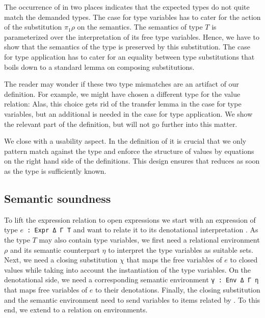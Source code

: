 \documentclass[sigplan,anonymous,review,screen]{acmart}
\begin{document}
The occurrence of {\Asubst} in two places indicates that the expected types do not quite
match the demanded types.
The case for type variables has to cater for the action of the
substitution $\pi_1\rho$ on the semantics. The semantics of type $T$
is parameterized over the interpretation of its free type
variables. Hence, we have to show that the semantics of the type is
preserved by this substitution.
\TFsubstVarPreservesType
The case for type application has to cater for an equality between
type substitutions that boils down to a standard lemma on composing
substitutions.
\LogicallemmaOne

The reader may wonder if these two type mismatches are an
artifact of our definition. For example, we might have chosen a
different type for the value relation:
\LogicalVariationMCVType
Alas, this choice gets rid of the transfer lemma in the case for type
variables, but an additional {\Asubst} is needed in the case for type
application. We show the relevant part of the definition, but will not go further into this matter.
\LogicalVariationMCVBodyUniversal

We close with a usability aspect.
In the definition of {\AVSem} it is crucial that we only pattern match
against the type and enforce the structure of values by equations on
the right hand side of the definitions. This design ensures that {\AVSem}
reduces as soon as the type is sufficiently known.

\subsection{Semantic soundness}
\label{sec:relat-open-expr}

To lift the expression relation {\AESem} to open expressions we start
with an expression of type \texttt{$e$ : Expr Δ Γ T} and want to relate it
to its denotational interpretation . As the type $T$
may also contain type variables, we first need a relational
environment $\rho$ and its semantic counterpart $\eta$ to interpret
the type variables as suitable sets.
Next, we need a closing substitution $\chi$ that maps the free
variables of $e$ to closed values while taking into account the
instantiation of the type variables. On the denotational side, we need
a corresponding semantic environment \texttt{γ : Env Δ Γ η} that maps
free variables of $e$ to their denotations. Finally, the closing
substitution and the semantic environment need to send variables to
items related by {\AVSem}. To this end, we extend {\AVSem} to a
relation {\AGSem} on environments.
\end{document}
